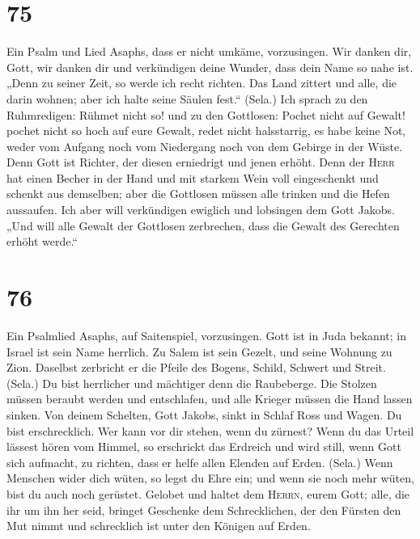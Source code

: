 \hypertarget{section-74}{%
\section{75}\label{section-74}}

 Ein Psalm und Lied Asaphs, dass er nicht umkäme,
vorzusingen.  Wir danken dir, Gott, wir danken dir und
verkündigen deine Wunder, dass dein Name so nahe ist. 
„Denn zu seiner Zeit, so werde ich recht richten.  Das
Land zittert und alle, die darin wohnen; aber ich halte seine Säulen
fest.`` (Sela.)  Ich sprach zu den Ruhmredigen: Rühmet
nicht so! und zu den Gottlosen: Pochet nicht auf Gewalt! 
pochet nicht so hoch auf eure Gewalt, redet nicht halsstarrig,
 es habe keine Not, weder vom Aufgang noch vom Niedergang
noch von dem Gebirge in der Wüste.  Denn Gott ist Richter,
der diesen erniedrigt und jenen erhöht.  Denn der
\textsc{Herr} hat einen Becher in der Hand und mit starkem Wein voll
eingeschenkt und schenkt aus demselben; aber die Gottlosen müssen alle
trinken und die Hefen aussaufen.  Ich aber will
verkündigen ewiglich und lobsingen dem Gott Jakobs.  „Und
will alle Gewalt der Gottlosen zerbrechen, dass die Gewalt des Gerechten
erhöht werde.``

\hypertarget{section-75}{%
\section{76}\label{section-75}}

 Ein Psalmlied Asaphs, auf Saitenspiel, vorzusingen.
 Gott ist in Juda bekannt; in Israel ist sein Name
herrlich.  Zu Salem ist sein Gezelt, und seine Wohnung zu
Zion.  Daselbst zerbricht er die Pfeile des Bogens,
Schild, Schwert und Streit. (Sela.)  Du bist herrlicher
und mächtiger denn die Raubeberge.  Die Stolzen müssen
beraubt werden und entschlafen, und alle Krieger müssen die Hand lassen
sinken.  Von deinem Schelten, Gott Jakobs, sinkt in Schlaf
Ross und Wagen.  Du bist erschrecklich. Wer kann vor dir
stehen, wenn du zürnest?  Wenn du das Urteil lässest hören
vom Himmel, so erschrickt das Erdreich und wird still, 
wenn Gott sich aufmacht, zu richten, dass er helfe allen Elenden auf
Erden. (Sela.)  Wenn Menschen wider dich wüten, so legst
du Ehre ein; und wenn sie noch mehr wüten, bist du auch noch gerüstet.
 Gelobet und haltet dem \textsc{Herrn}, eurem Gott; alle,
die ihr um ihn her seid, bringet Geschenke dem Schrecklichen,
 der den Fürsten den Mut nimmt und schrecklich ist unter
den Königen auf Erden.

